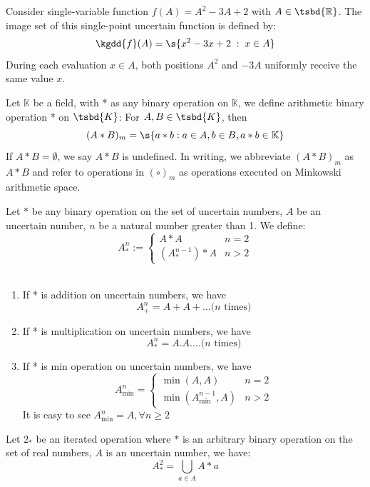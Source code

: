 \begin{example}
	Consider single-variable function $f(A) = A^2 - 3A + 2$ with $A \in \tsbd{\mathbb{R}}$. The image set of this single-point uncertain function is defined by:
	\[
	\kgdd{f}(A) = \s{x^2 - 3x + 2 \;:\; x \in A}
	\]
	During each evaluation $x \in A$, both positions $A^2$ and $-3A$ uniformly receive the same value $x$.
\end{example}
\begin{definition}
	Let $\mathbb{K}$ be a field, with * as any binary operation on $\mathbb{K}$, we define arithmetic binary operation * on $\tsbd{K}$:
	For $A,B \in \tsbd{K}$, then $$(A * B)_m = \s{a*b : a \in A , b\in B , a*b \in \mathbb{K}}$$
	\noindent If $A * B =\emptyset$, we say $A * B$ is undefined. In writing, we abbreviate $(A*B)_m$ as $A*B$ and refer to operations in $(\circ)_m$ as operations executed on Minkowski arithmetic space.
\end{definition}
\begin{definition}
	Let $*$ be any binary operation on the set of uncertain numbers, $A$ be an uncertain number, $n$ be a natural number greater than 1. We define: $$A^{n}_{*} := \begin{cases}
		A*A & n=2 \\
		\left(A^{n-1}_*\right) * A & n > 2
	\end{cases}
	$$\
\end{definition}
\begin{example}
	\begin{enumerate}
		\item If * is addition on uncertain numbers, we have $$A^n_+ = A+A+... \text{($n$ times)}$$
		\item If * is multiplication on uncertain numbers, we have $$A^n_* = A.A .... \text{($n$ times)}$$
		\item If * is min operation on uncertain numbers, we have
		$$A^n_{\min} = \begin{cases}
			\min(A,A) & n=2 \\
			\min\left(A^{n-1}_{\min}, A\right) & n > 2
		\end{cases} $$
		It is easy to see $A^n_{\min} = A, \forall n \geq 2$
	\end{enumerate}
\end{example}
\begin{example}
	Let $2_*$ be an iterated operation where $*$ is an arbitrary binary operation on the set of real numbers, $A$ is an uncertain number, we have:
	\[A^2_* = \bigcup_{a \in A} A * a \]
\end{example}

